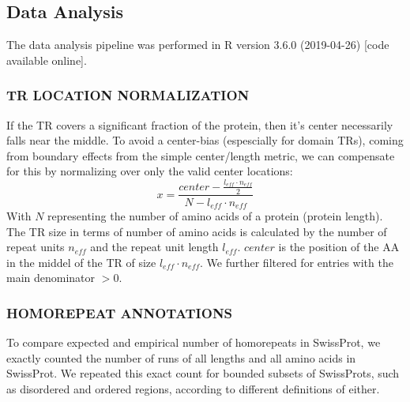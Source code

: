 \documentclass[a4,center,fleqn]{NAR}
\begin{document}
%
%

\subsection{Data Analysis}
The data analysis pipeline was performed in R version 3.6.0 (2019-04-26) \cite{R} [code available online].

\subsubsection{\MakeUppercase{TR location normalization}}
If the TR covers a significant fraction of the protein, then it's center necessarily falls near the middle. To avoid a center-bias (espescially for domain TRs), coming from boundary effects from the simple center/length metric, we can compensate for this by normalizing over only the valid center locations:
\begin{equation}
x = \frac{center - \frac{l_{eff} \cdot n_{eff}}{2}}{N-l_{eff} \cdot n_{eff}}
\end{equation}
With $N$ representing the number of amino acids of a protein (protein length). The TR size in terms of number of amino acids is calculated by the number of repeat units $n_{eff}$ and the repeat unit length $l_{eff}$. $center$ is the position of the AA in the middel of the TR of size $l_{eff} \cdot n_{eff}$. We further filtered for entries with the main denominator $>0$.

\subsubsection{\MakeUppercase{Homorepeat annotations}}
To  compare expected and empirical number of homorepeats in SwissProt, we exactly counted the number of runs of all lengths and all amino acids in SwissProt. We repeated this exact count for bounded subsets of SwissProts, such as disordered and ordered regions, according to different definitions of either.
\end{document}
